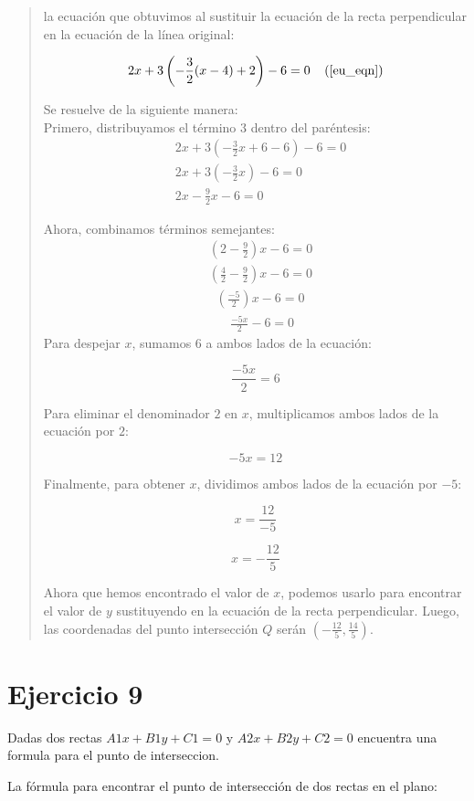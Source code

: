 \documentclass{article}
\begin{document}
\begin{quote}
la ecuación que obtuvimos al sustituir la ecuación de la recta perpendicular
 en la ecuación de la línea original:

\[ 2x + 3\left(-\frac{3}{2}(x - 4) + 2\right) - 6 = 0\;\;\;\;(\ref{eu_eqn}) \] 

\noindent Se resuelve de la siguiente manera:\\
Primero, distribuyamos el término \(3\) dentro del paréntesis:
\begin{align*}
 &2x + 3\left(-\frac{3}{2}x + 6 - 6\right) - 6 = 0\\ 
 &2x + 3\left(-\frac{3}{2}x\right) - 6 = 0\\
 &2x - \frac{9}{2}x - 6 = 0
\end{align*}

Ahora, combinamos términos semejantes:
\begin{align*}
 &\left(2 - \frac{9}{2}\right)x - 6 = 0\\
 &\left(\frac{4}{2} - \frac{9}{2}\right)x - 6 = 0\\
 &\;\;\left(\frac{-5}{2}\right)x - 6 = 0\\
 &\;\;\;\;\;\;\frac{-5x}{2} - 6 = 0
\end{align*}
Para despejar \(x\), sumamos \(6\) a ambos lados de la ecuación:

\[ \frac{-5x}{2} = 6 \]

Para eliminar el denominador \(2\) en \(x\), multiplicamos ambos lados de la ecuación por \(2\):

\[ -5x = 12 \]

Finalmente, para obtener \(x\), dividimos ambos lados de la ecuación por \(-5\):

\[ x = \frac{12}{-5} \]

\[ x = -\frac{12}{5} \]

Ahora que hemos encontrado el valor de \(x\), 
podemos usarlo para encontrar el valor de \(y\) 
sustituyendo en la ecuación de la recta perpendicular.
 Luego, las coordenadas del punto intersección \(Q\)
  serán \((- \frac{12}{5}, \frac{14}{5})\).
\end{quote} 
\section*{Ejercicio 9}
Dadas dos rectas $A1x + B1y + C1 = 0$ y $A2x + B2y + C2 = 0$
encuentra una formula para el punto de interseccion.

\noindent La fórmula para encontrar el punto de intersección 
de dos rectas en el plano:
\end{document}
